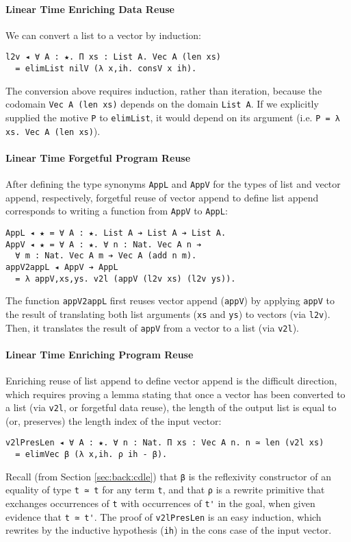\documentclass[acmsmall,screen]{acmart}
\newcommand{\refsec}[1]{Section \ref{sec:#1}}
\begin{document}
\paragraph{Linear Time Enriching Data Reuse}
We can convert a list to a vector by induction:
\begin{verbatim}
l2v ◂ ∀ A : ★. Π xs : List A. Vec A (len xs)
  = elimList nilV (λ x,ih. consV x ih).
\end{verbatim}
The conversion above requires induction, rather than iteration,
because the codomain \texttt{Vec A (len xs)} depends on the domain
\verb;List A;. If we explicitly supplied the motive \verb;P; to
\verb;elimList;, it would depend on its argument
(i.e. \verb;P = λ xs. Vec A (len xs);).

\paragraph{Linear Time Forgetful Program Reuse}
After defining the type synonyms \verb;AppL; and \verb;AppV; for the
types of list and vector append, respectively, forgetful reuse of
vector append to define list append corresponds to writing a function from
\verb;AppV; to \verb;AppL;:
\begin{verbatim}
AppL ◂ ★ = ∀ A : ★. List A ➔ List A ➔ List A.
AppV ◂ ★ = ∀ A : ★. ∀ n : Nat. Vec A n ➔ 
  ∀ m : Nat. Vec A m ➔ Vec A (add n m).
appV2appL ◂ AppV ➔ AppL
  = λ appV,xs,ys. v2l (appV (l2v xs) (l2v ys)).
\end{verbatim}
The function \verb;appV2appL; first reuses vector append
(\verb;appV;) by applying \verb;appV; to the result of
translating both list arguments (\verb;xs; and \verb;ys;) to
vectors (via \verb;l2v;). Then, it translates the result of
\verb;appV; from a vector to a list (via \verb;v2l;).

\paragraph{Linear Time Enriching Program Reuse}

Enriching reuse of list append to define vector append is the
difficult direction, which requires proving a lemma stating
that once a vector has been converted to a list
(via \verb;v2l;, or forgetful data reuse), the length of the output
list is equal to (or, preserves) the length index of the input vector:
\begin{verbatim}
v2lPresLen ◂ ∀ A : ★. ∀ n : Nat. Π xs : Vec A n. n ≃ len (v2l xs) 
  = elimVec β (λ x,ih. ρ ih - β).
\end{verbatim}
Recall (from \refsec{back:cdle}) that \verb;β; is the reflexivity constructor
of an equality of type \verb;t ≃ t; for any term \verb;t;,
and that \verb;ρ; is a rewrite primitive that exchanges
occurrences of \verb;t; with occurrences of \verb;t'; in the goal,
when given evidence that \verb;t ≃ t';. The proof of \verb;v2lPresLen;
is an easy induction, which rewrites by the inductive hypothesis
(\verb;ih;) in the cons case of the input vector.
\end{document}
